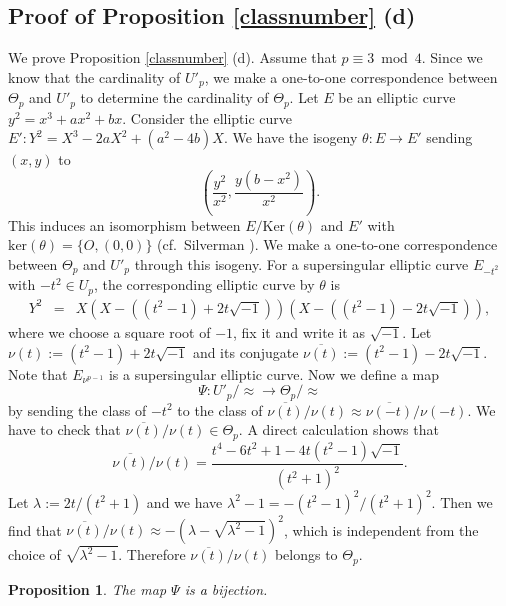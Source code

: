 \documentclass[10pt,a4paper]{amsart}
\theoremstyle{plain}
\newtheorem{prop}[defn]{Proposition}
\newcommand{\lm}{\lambda}
\begin{document}
\subsection{Proof of Proposition \ref{classnumber} (d)}
\label{kakkogonituite}
We prove Proposition \ref{classnumber} (d). Assume that $p \equiv 3 \bmod 4$. Since we know that the cardinality of ${U'}_p$, we make a one-to-one correspondence between ${\Theta}_p$ and $U'_p$ to determine the cardinality of ${\Theta}_p$. Let $E$ be an elliptic curve $y^2=x^3+ax^2+bx$. Consider the elliptic curve $E': Y^2=X^3-2aX^2+(a^2-4b)X$. We have the isogeny $\theta:E \longrightarrow E'$ sending $(x,y)$ to
\[
\left( \frac{y^2}{x^2}, \frac{y(b-x^2)}{x^2} \right).
\]
This induces an isomorphism between $E/{\textrm{Ker}(\theta)}$ and $E'$ with $\text{ker}(\theta)=\{ O, (0,0)\}$ (cf.\ Silverman \cite[Proposition 10.4.9]{AEC}). We make a one-to-one correspondence between ${\Theta}_p$ and $U'_p$ through this isogeny.
For a supersingular elliptic curve $E_{-t^2}$ with $-t^2 \in U_p$, the corresponding elliptic curve by $\theta$ is
\begin{eqnarray*}
    Y^2&=&X \left(X- \left( (t^2-1)+2t\sqrt{-1} \right) \right) \left(X- \left( (t^2-1)-2t\sqrt{-1} \right) \right),
\end{eqnarray*}
where we choose a square root of $-1$, fix it and write it as $\sqrt{-1}$. Let $\nu(t):=(t^2-1)+2t\sqrt{-1} $ and its conjugate $\overline{\nu(t)}:=(t^2-1)-2t\sqrt{-1}$. Note that $E_{{\nu}^{p-1}}$ is a supersingular elliptic curve. Now we define a map
   \[
   {\Psi}:U'_p/ \approx \longrightarrow {\Theta}_{p} / \approx
   \]
 by sending the class of $-t^2$ to the class of 
    $\overline{\nu(t)}/ \nu(t) \approx \overline{\nu(-t)}/ \nu(-t)$.
We have to check that $\overline{\nu(t)}/\nu(t) \in {\Theta}_p$.
A direct calculation shows that
\[
\overline{\nu(t)}/\nu(t) = \frac{t^4-6t^2+1-4t(t^2-1)\sqrt{-1}}{(t^2+1)^2}.
\]
Let $\lm :=2t/(t^2+1)$ and we have ${\lm}^2-1=-(t^2-1)^2/(t^2+1)^2$. Then we find that 
$\overline{\nu(t)}/ \nu(t) \approx-(\lm-\sqrt{{\lm}^2-1})^2$, which is independent from the choice of $\sqrt{{\lm}^2-1}$.
Therefore $\overline{\nu(t)}/\nu(t) $ belongs to ${\Theta}_p$.
\begin{prop}
    \label{thetaup}
    The map $\Psi$ is \textcolor{black}{a} bijection.
\end{prop}
\end{document}
